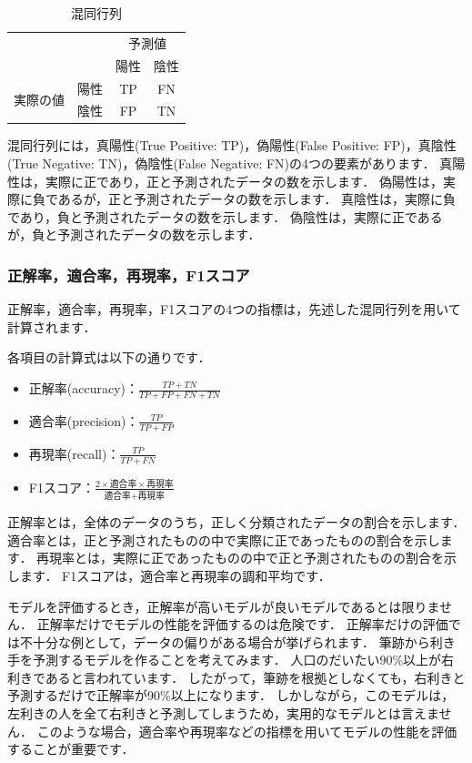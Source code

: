 \documentclass{jarticle}
\begin{document}
\begin{table}[H]
  \centering
  \caption{混同行列}
  \label{tb:confusion_matrix}
  \begin{tabular}{c|c|c c}\hline
    \multicolumn{2}{c}{} & \multicolumn{2}{|c}{予測値} \\
    \cline{3-4}
    \multicolumn{1}{c}{} &  & 陽性 & 陰性 \\
    \hline
    \multirow{2}{*}{実際の値} & 陽性 & TP & FN \\
    & 陰性 & FP & TN \\
    \hline
  \end{tabular}
\end{table}

混同行列には，真陽性(True Positive: TP)，偽陽性(False Positive: FP)，真陰性(True Negative: TN)，偽陰性(False Negative: FN)の4つの要素があります．
真陽性は，実際に正であり，正と予測されたデータの数を示します．
偽陽性は，実際に負であるが，正と予測されたデータの数を示します．
真陰性は，実際に負であり，負と予測されたデータの数を示します．
偽陰性は，実際に正であるが，負と予測されたデータの数を示します．

\subsubsection{正解率，適合率，再現率，F1スコア}
正解率，適合率，再現率，F1スコアの4つの指標は，先述した混同行列を用いて計算されます．

各項目の計算式は以下の通りです．

\begin{itemize}
  \item 正解率(accuracy)：$\frac{TP + TN}{TP + FP + FN + TN}$
  \item 適合率(precision)：$\frac{TP}{TP + FP}$
  \item 再現率(recall)：$\frac{TP}{TP + FN}$
  \item F1スコア：$\frac{2 \times \text{適合率} \times \text{再現率}}{\text{適合率} + \text{再現率}}$
\end{itemize}

正解率とは，全体のデータのうち，正しく分類されたデータの割合を示します．
適合率とは，正と予測されたものの中で実際に正であったものの割合を示します．
再現率とは，実際に正であったものの中で正と予測されたものの割合を示します．
F1スコアは，適合率と再現率の調和平均です．

モデルを評価するとき，正解率が高いモデルが良いモデルであるとは限りません．
正解率だけでモデルの性能を評価するのは危険です．
正解率だけの評価では不十分な例として，データの偏りがある場合が挙げられます．
筆跡から利き手を予測するモデルを作ることを考えてみます．
人口のだいたい90\%以上が右利きであると言われています．
したがって，筆跡を根拠としなくても，右利きと予測するだけで正解率が90\%以上になります．
しかしながら，このモデルは，左利きの人を全て右利きと予測してしまうため，実用的なモデルとは言えません．
このような場合，適合率や再現率などの指標を用いてモデルの性能を評価することが重要です．
\end{document}
